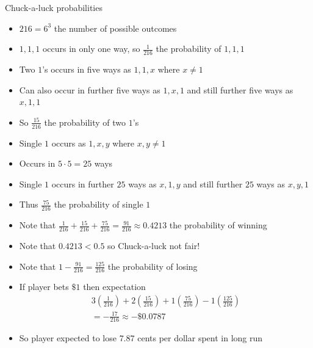 \documentclass[handout]{beamer}
\theoremstyle{definition}
\begin{document}
\begin{frame}{Chuck-a-luck probabilities}
\begin{itemize}
\item $216=6^3$ the number of possible outcomes
\item $1,1,1$ occurs in only one way, so $\frac{1}{216}$
the probability of $1,1,1$
\item Two $1$'s occurs in five ways as $1,1,x$
where $x\ne 1$
\item Can also occur in further five ways as $1,x,1$
and still further five ways as $x,1,1$
\item So $\frac{15}{216}$ the probability of two $1$'s
\item Single $1$ occurs as $1,x,y$ where $x,y\ne 1$
\item Occurs in $5\cdot 5=25$ ways
\item Single $1$ occurs in further $25$ ways as $x,1,y$
and still further $25$ ways as $x,y,1$
\item Thus $\frac{75}{216}$ the probability of single $1$
\end{itemize}
\end{frame}

\begin{frame}
\begin{itemize}
\item Note that $\frac{1}{216}+\frac{15}{216}+\frac{75}{216}
=\frac{91}{216}\approx 0.4213$ the probability of winning
\item Note that $0.4213<0.5$ so Chuck-a-luck \alert{not} fair!
\item Note that $1-\frac{91}{216}=\frac{125}{216}$
the probability of losing
\item If player bets $\$1$ then expectation
\begin{multline*}
3\left(\frac{1}{216}\right)
+2\left(\frac{15}{216}\right)+1\left(\frac{75}{216}\right)
-1\left(\frac{125}{216}\right)\\
=-\frac{17}{216}\approx -\$0.0787
\end{multline*}
\item So player expected to lose $7.87$ cents per dollar spent
in long run
\end{itemize}
\end{frame}
\end{document}
